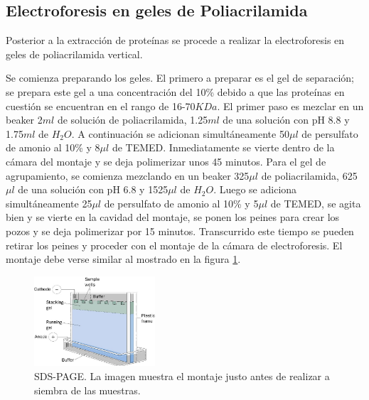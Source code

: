 \documentclass[%
 reprint,
 amsmath,amssymb,
 aps,
showkeys,
letter,
12pts
]{revtex4-1}
\begin{document}
			
	\subsection{\label{sec:ElectroMet}Electroforesis en geles de Poliacrilamida}		
		Posterior a la extracción de proteínas se procede a realizar la electroforesis en geles de poliacrilamida vertical. 
		
		Se comienza preparando los geles. El primero a preparar es el gel de separación; se prepara este gel a una concentración del 10\% debido a que las proteínas en cuestión se encuentran en el rango de 16-70$KDa$. El primer paso es mezclar en un beaker 2$ml$ de solución de poliacrilamida, 1.25$ml$ de una solución con pH 8.8 y 1.75$ml$ de $H_2O$. A continuación se adicionan simultáneamente 50$\mu l$ de persulfato de amonio al 10\% y 8$\mu l$ de TEMED. Inmediatamente se vierte dentro de la cámara del montaje y se deja polimerizar unos 45 minutos. Para el gel de agrupamiento, se comienza mezclando en un beaker 325$\mu l$ de poliacrilamida, 625$\mu l$ de una solución con pH 6.8 y 1525$\mu l$ de $H_2O$. Luego se adiciona simultáneamente 25$\mu l$ de persulfato de amonio al 10\% y 5$\mu l$ de TEMED, se agita bien y se vierte en la cavidad del montaje, se ponen los peines para crear los pozos y se deja polimerizar por 15 minutos. Transcurrido este tiempo se pueden retirar los peines y proceder con el montaje de la cámara de electroforesis. El montaje debe verse similar al mostrado en la figura \ref{Imagen: SDS-PAGE}.
		
		\begin{figure}[h]
		\includegraphics[width=0.4\textwidth]{SDS-PAGE.jpg}
		\caption{SDS-PAGE. La imagen muestra el montaje justo antes de realizar a siembra de las muestras.}
		\label{Imagen: SDS-PAGE}
		\end{figure} 
\end{document}
